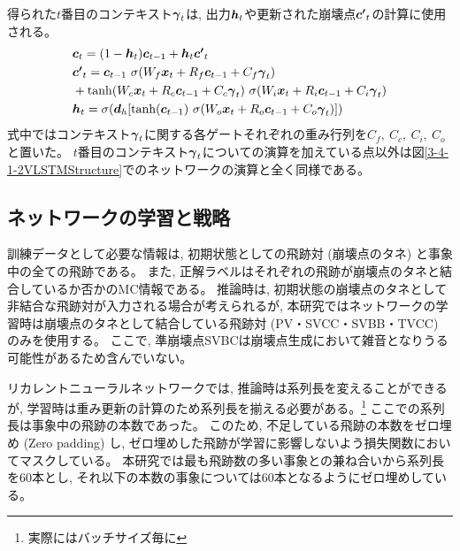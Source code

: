 得られた$t$番目のコンテキスト${\mbox{\boldmath{$\gamma$}}}_{t}$は, 出力${\mbox{\boldmath{$h$}}}_{t}$や更新された崩壊点${\mbox{\boldmath{$c'$}}}_{t}$の計算に使用される。
\begin{equation}
 \begin{split}
  &{\mbox{\boldmath{$c$}}}_{t} 
  = (1-{\mbox{\boldmath{$h$}}}_t) {\mbox{\boldmath{$c$}}}_{t-1} + {\mbox{\boldmath{$h$}}}_t {\mbox{\boldmath{$c'$}}}_{t}\\
  &{\mbox{\boldmath{$c'$}}}_{t}
  = {\mbox{\boldmath{$c$}}}_{t-1} \  \sigma (W_f {\mbox{\boldmath{$x$}}}_t + R_f {\mbox{\boldmath{$c$}}}_{t-1} + C_f {\mbox{\boldmath{$\gamma$}}}_{t})\\
  &+ \tanh (W_c {\mbox{\boldmath{$x$}}}_t + R_c {\mbox{\boldmath{$c$}}}_{t-1} + C_c {\mbox{\boldmath{$\gamma$}}}_{t}) \  \sigma (W_i {\mbox{\boldmath{$x$}}}_t + R_i {\mbox{\boldmath{$c$}}}_{t-1} + C_i {\mbox{\boldmath{$\gamma$}}}_{t})\\
  &{\mbox{\boldmath{$h$}}}_{t} 
  = \sigma ({\mbox{\boldmath{$d$}}}_h [\tanh({\mbox{\boldmath{$c$}}}_{t-1}) \  \sigma (W_o {\mbox{\boldmath{$x$}}}_t + R_o {\mbox{\boldmath{$c$}}}_{t-1} + C_o {\mbox{\boldmath{$\gamma$}}}_{t}) ])
 \end{split}
\end{equation}
式中ではコンテキスト${\mbox{\boldmath{$\gamma$}}}_{t}$に関する各ゲートそれぞれの重み行列を$C_f,\ C_c,\ C_i,\ C_o$と置いた。
$t$番目のコンテキスト${\mbox{\boldmath{$\gamma$}}}_{t}$についての演算を加えている点以外は図\ref{3-4-1-2VLSTMStructure}でのネットワークの演算と全く同様である。


\subsection{ネットワークの学習と戦略} \label{Net:VLSTM:TrainingandStrategyofVLSTM}

訓練データとして必要な情報は, 初期状態としての飛跡対 (崩壊点のタネ) と事象中の全ての飛跡である。
また, 正解ラベルはそれぞれの飛跡が崩壊点のタネと結合しているか否かのMC情報である。
推論時は, 初期状態の崩壊点のタネとして非結合な飛跡対が入力される場合が考えられるが, 本研究ではネットワークの学習時は崩壊点のタネとして結合している飛跡対 (PV・SVCC・SVBB・TVCC) のみを使用する。
ここで, 準崩壊点SVBCは崩壊点生成において雑音となりうる可能性があるため含んでいない。

リカレントニューラルネットワークでは, 推論時は系列長を変えることができるが, 学習時は重み更新の計算のため系列長を揃える必要がある。\footnote{実際にはバッチサイズ毎に}
ここでの系列長は事象中の飛跡の本数であった。
このため, 不足している飛跡の本数をゼロ埋め (Zero padding) し, ゼロ埋めした飛跡が学習に影響しないよう損失関数においてマスクしている。
本研究では最も飛跡数の多い事象との兼ね合いから系列長を$60$本とし, それ以下の本数の事象については$60$本となるようにゼロ埋めしている。

